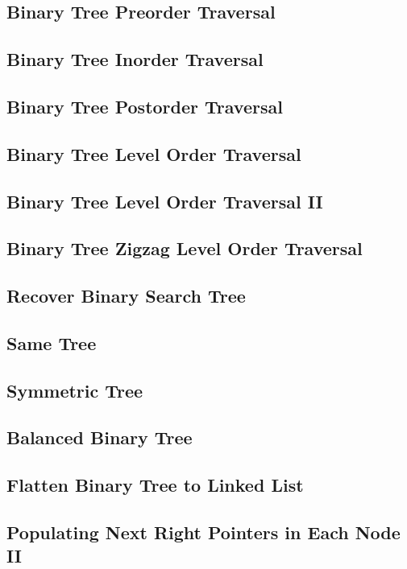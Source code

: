 \documentclass[11pt]{book}
\begin{document}
\subsection{Binary Tree Preorder Traversal}
\label{sec-4-1-1}
\subsection{Binary Tree Inorder Traversal}
\label{sec-4-1-2}
\subsection{Binary Tree Postorder Traversal}
\label{sec-4-1-3}
\subsection{Binary Tree Level Order Traversal}
\label{sec-4-1-4}
\subsection{Binary Tree Level Order Traversal II}
\label{sec-4-1-5}
\subsection{Binary Tree Zigzag Level Order Traversal}
\label{sec-4-1-6}
\subsection{Recover Binary Search Tree}
\label{sec-4-1-7}

\subsection{Same Tree}
\label{sec-4-1-8}
\subsection{Symmetric Tree}
\label{sec-4-1-9}
\subsection{Balanced Binary Tree}
\label{sec-4-1-10}
\subsection{Flatten Binary Tree to Linked List}
\label{sec-4-1-11}
\subsection{Populating Next Right Pointers in Each Node II}
\label{sec-4-1-12}
\end{document}
